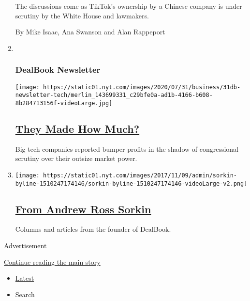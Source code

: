 \begin{enumerate}
  The discussions come as TikTok's ownership by a Chinese company is
  under scrutiny by the White House and lawmakers.

  By Mike Isaac, Ana Swanson and Alan Rappeport
\item ~
  \hypertarget{dealbook-newsletter-1}{%
  \subsubsection{DealBook Newsletter}\label{dealbook-newsletter-1}}

  \texttt{[image: https://static01.nyt.com/images/2020/07/31/business/31db-newsletter-tech/merlin\_143699331\_c29bfe0a-ad1b-4166-b608-8b284713156f-videoLarge.jpg]}

  \hypertarget{they-made-how-much}{%
  \subsection{\texorpdfstring{\href{/2020/07/31/business/dealbook/tech-earnings-economy.html}{They
  Made How Much?}}{They Made How Much?}}\label{they-made-how-much}}

  Big tech companies reported bumper profits in the shadow of
  congressional scrutiny over their outsize market power.
\item
  \texttt{[image: https://static01.nyt.com/images/2017/11/09/admin/sorkin-byline-1510247174146/sorkin-byline-1510247174146-videoLarge-v2.png]}

  \hypertarget{from-andrew-ross-sorkin}{%
  \subsection{\texorpdfstring{\href{/interactive/2017/business/dealbook/sorkin-byline.html}{From
  Andrew Ross
  Sorkin}}{From Andrew Ross Sorkin}}\label{from-andrew-ross-sorkin}}

  Columns and articles from the founder of DealBook.
\end{enumerate}

Advertisement

\protect\hyperlink{after-mid1}{Continue reading the main story}

\begin{itemize}
\tightlist
\item
  \protect\hyperlink{stream-panel}{Latest}
\item
  Search
\end{itemize}

